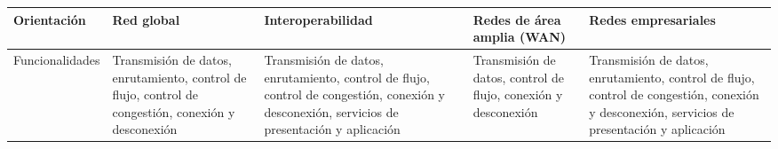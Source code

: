 \begin{longtable}{|>{\raggedright\arraybackslash}m{2.4cm}|>{\raggedright\arraybackslash}m{2.8cm}|>{\raggedright\arraybackslash}m{2.8cm}|>{\raggedright\arraybackslash}m{2.8cm}|>{\raggedright\arraybackslash}m{2.8cm}|}
      Orientación             & Red global                                                                                                                                                                             & Interoperabilidad                                                                                                                                                                                                                                    & Redes de área amplia (WAN)                                                                                                                                                                                                                                                                                                                                                       & Redes empresariales                                                                                                                                                                                                                                                                    \\ \hline
      Funcionalidades         & Transmisión de datos, enrutamiento, control de flujo, control de congestión, conexión y desconexión                                                                                    & Transmisión de datos, enrutamiento, control de flujo, control de congestión, conexión y desconexión, servicios de presentación y aplicación                                                                                                          & Transmisión de datos, control de flujo, conexión y desconexión                                                                                                                                                                                                                                                                                                                   & Transmisión de datos, enrutamiento, control de flujo, control de congestión, conexión y desconexión, servicios de presentación y aplicación                                                                                                                                            \\ \hline

\end{longtable}

